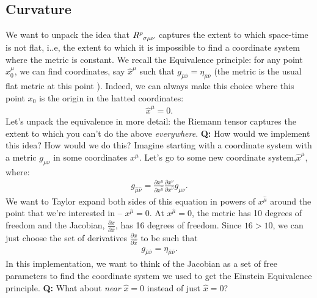 \documentclass[11pt]{article}
\newcommand{\grmetric}[0]{g_{\mu \nu}}
\newcommand{\riemanntensor}[0]{\tensor{R}{^\rho_{\sigma \mu \nu}}}
\newcommand{\jac}[0]{\frac{\partial x}{\partial \hat{x}}}
\theoremstyle{definition}
\begin{document}
\subsection{Curvature}
We want to unpack the idea that \( \riemanntensor \) captures the extent to which space-time is not flat, i..e, the extent to which it is impossible to find a coordinate system where the metric is constant. We recall the Equivalence principle: for any point \( x_0^\mu \), we can find coordinates, say \( \hat{x}^\mu \) such that \( g_{\hat{\mu} \hat{\nu}} = \eta_{\hat{\mu} \hat{\nu}} \) (the metric is the usual flat metric at this point ). Indeed, we can always make this choice where this point \( x_0 \) 
is the origin in the hatted coordinates: 
\begin{align*}
	\hat{x}^\mu = 0.
\end{align*}
Let's unpack the equivalence in more detail: the Riemann tensor captures the extent to which you can't do the above \emph{everywhere}. 
\newline
\newline
\textbf{Q:} How would we implement this idea? How would we do this? 
\newline
\newline
Imagine starting with a coordinate system with a metric \( \grmetric \) in some coordinates \( x^\mu \). Let's go to some new coordinate system,\( \hat{x}^\mu \), where: 
\begin{align*}
	g_{\hat{\mu} \hat{\nu}} = \frac{\partial x^\mu}{\partial x^{\hat{\mu}}}\frac{\partial x^\nu}{\partial x^{\hat{\nu}}} \grmetric.
\end{align*}
We want to Taylor expand both sides of this equation in powers of \( x^{\hat{\mu}} \) around the point that we're interested in -- \( x^{\hat{\mu}}  = 0 \). At \(  x^{\hat{\mu}}  = 0 \), the metric has 10 degrees of freedom and the Jacobian, \( \jac \), has 16 degrees of freedom. Since \( 16 > 10 \), we can just choose the set of derivatives \( \jac \) to be such that
\begin{align*}
	g_{\hat{\mu} \hat{\nu}} = \eta_{\hat{\mu} \hat{\nu}}.
\end{align*}
In this implementation, we want to think of the Jacobian as a set of free parameters to find the coordinate system we used to get the Einstein Equivalence principle. 
\newline
\newline
\textbf{Q:} What about \emph{near} \( \hat{x} = 0 \) instead of just \( \hat{x} = 0 \)?
\newline
\end{document}

